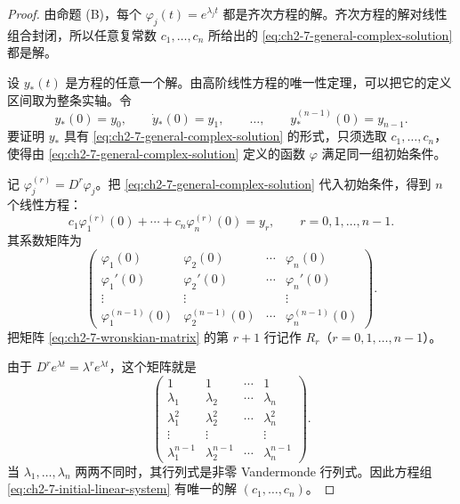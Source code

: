 \begin{proof}
由命题 (B)，每个 \(\varphi_j(t)=e^{\lambda_jt}\) 都是齐次方程的解。齐次方程的解对线性组合封闭，所以任意复常数 \(c_1,\ldots,c_n\) 所给出的 \eqref{eq:ch2-7-general-complex-solution} 都是解。

设 \(y_*(t)\) 是方程的任意一个解。由高阶线性方程的唯一性定理，可以把它的定义区间取为整条实轴。令
\begin{equation}
 y_*(0)=y_0,\qquad
 \dot y_*(0)=y_1,\qquad\ldots,\qquad
 y_*^{(n-1)}(0)=y_{n-1}.
 \label{eq:ch2-7-initial-vector}
\end{equation}
要证明 \(y_*\) 具有 \eqref{eq:ch2-7-general-complex-solution} 的形式，只须选取 \(c_1,\ldots,c_n\)，使得由 \eqref{eq:ch2-7-general-complex-solution} 定义的函数 \(\varphi\) 满足同一组初始条件。

记 \(\varphi_j^{(r)}=D^r\varphi_j\)。把 \eqref{eq:ch2-7-general-complex-solution} 代入初始条件，得到 \(n\) 个线性方程：
\begin{equation}
 c_1\varphi_1^{(r)}(0)+\cdots+c_n\varphi_n^{(r)}(0)=y_r,
 \qquad r=0,1,\ldots,n-1.
 \label{eq:ch2-7-initial-linear-system}
\end{equation}
其系数矩阵为
\begin{equation}
 \begin{pmatrix}
  \varphi_1(0)&\varphi_2(0)&\cdots&\varphi_n(0)\\
  \varphi_1'(0)&\varphi_2'(0)&\cdots&\varphi_n'(0)\\
  \vdots&\vdots&&\vdots\\
  \varphi_1^{(n-1)}(0)&\varphi_2^{(n-1)}(0)&\cdots&\varphi_n^{(n-1)}(0)
 \end{pmatrix}.
 \label{eq:ch2-7-wronskian-matrix}
\end{equation}
把矩阵 \eqref{eq:ch2-7-wronskian-matrix} 的第 \(r+1\) 行记作 \(R_r\)（\(r=0,1,\ldots,n-1\)）。

由于 \(D^re^{\lambda t}=\lambda^re^{\lambda t}\)，这个矩阵就是
\begin{equation}
 \begin{pmatrix}
  1&1&\cdots&1\\
  \lambda_1&\lambda_2&\cdots&\lambda_n\\
  \lambda_1^2&\lambda_2^2&\cdots&\lambda_n^2\\
  \vdots&\vdots&&\vdots\\
  \lambda_1^{n-1}&\lambda_2^{n-1}&\cdots&\lambda_n^{n-1}
 \end{pmatrix}.
 \label{eq:ch2-7-vandermonde}
\end{equation}
当 \(\lambda_1,\ldots,\lambda_n\) 两两不同时，其行列式是非零 Vandermonde 行列式。因此方程组 \eqref{eq:ch2-7-initial-linear-system} 有唯一的解 \((c_1,\ldots,c_n)\)。


\end{proof}
